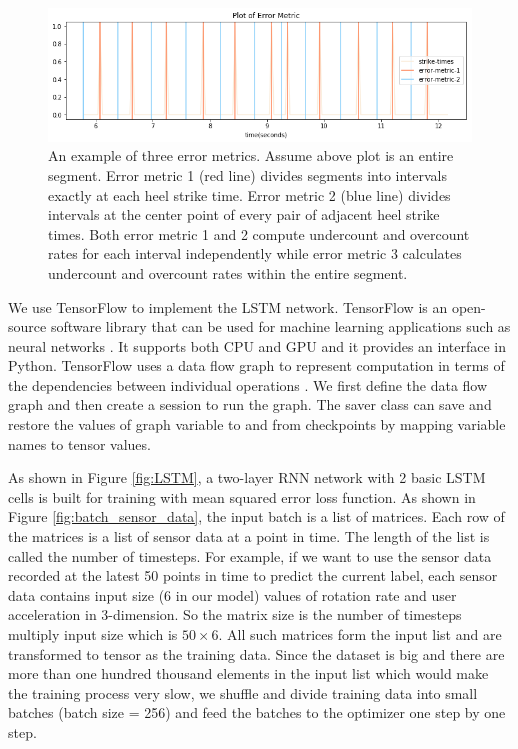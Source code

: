 \documentclass[11pt]{article}
\begin{document}
{\begin{figure}[ht]
\centering
\includegraphics[scale=0.6]{error_metric}
\caption{An example of three error metrics. Assume above plot is an entire segment. Error metric 1 (red line) divides segments into intervals exactly at each heel strike time. Error metric 2 (blue line) divides intervals at the center point of every pair of adjacent heel strike times. Both error metric 1 and 2 compute undercount and overcount rates for each interval independently while error metric 3 calculates undercount and overcount rates within the entire segment.}
\label{fig:error_metric}
\end{figure}

We use TensorFlow to implement the LSTM network. TensorFlow is an open-source software library that can be used for machine learning applications such as neural networks \cite{wiki:tensorflow}. It supports both CPU and GPU and it provides an interface in Python. TensorFlow uses a data flow graph to represent computation in terms of the dependencies between individual operations \cite{tensorflow.org}. We first define the data flow graph and then create a session to run the graph. The saver class can save and restore the values of graph variable to and from checkpoints by mapping variable names to tensor values.

As shown in Figure \ref{fig:LSTM}, a two-layer RNN network with 2 basic LSTM cells is built for training with mean squared error loss function. 
As shown in Figure \ref{fig:batch_sensor_data}, the input batch is a list of matrices. Each row of the matrices is a list of sensor data at a point in time. The length of the list is called the number of timesteps.
For example, if we want to use the sensor data recorded at the latest 50 points in time to predict the current label, each sensor data contains input size ($6$ in our model) values of rotation rate and user acceleration in 3-dimension. So the matrix size is the number of timesteps multiply input size which is $50 \times 6$. All such matrices form the input list and are transformed to tensor as the training data. Since the dataset is big and there are more than one hundred thousand elements in the input list which would make the training process very slow, we shuffle and divide training data into small batches (batch size = 256) and feed the batches to the optimizer one step by one step.

}
\end{document}
